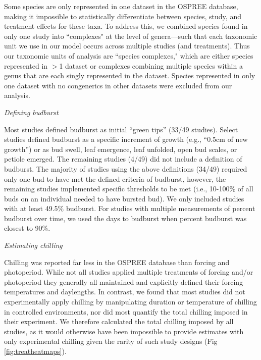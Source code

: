\documentclass{article}
\begin{document}
\par Some species are only represented in one dataset in the OSPREE database, making it impossible to statistically differentiate between species, study, and treatment effects for these taxa. To address this, we combined species found in only one study into ``complexes" at the level of genera---such that each taxonomic unit we use in our model occurs across multiple studies (and treatments). Thus our taxonomic units of analysis are ``species complexes," which are either species represented in $>$1 dataset or complexes combining multiple species within a genus that are each singly represented in the dataset. Species represented in only one dataset with no congenerics in other datasets were excluded from our analysis.

\par \emph{Defining budburst}

Most studies defined budburst as initial ``green tips'' (33/49 studies). Select studies defined budburst as a specific increment of growth (e.g., ``0.5cm of new growth'') or as bud swell, leaf emergence, leaf unfolded, open bud scales, or petiole emerged. The remaining studies (4/49) did not include a definition of budburst. The majority of studies using the above definitions (34/49) required only one bud to have met the defined criteria of budburst, however, the remaining studies implemented specific thresholds to be met (i.e., 10-100\% of all buds on an individual needed to have bursted bud). We only included studies with at least 49.5\% budburst. For studies with multiple measurements of percent budburst over time, we used the days to budburst when percent budburst was closest to 90\%.

\par{\emph{Estimating chilling}}

Chilling was reported far less in the OSPREE database than forcing and photoperiod. While not all studies applied multiple treatments of forcing and/or photoperiod they generally all maintained and explicitly defined their forcing temperatures and daylengths. In contrast, we found that most studies did not experimentally apply chilling by manipulating duration or temperature of chilling in controlled environments, nor did most quantify the total chilling imposed in their experiment. We therefore calculated the total chilling imposed by all studies, as it would otherwise have been impossible to provide estimates with only experimental chilling given the rarity of such study designs (Fig \ref{fig:treatheatmaps}). 
\end{document}
